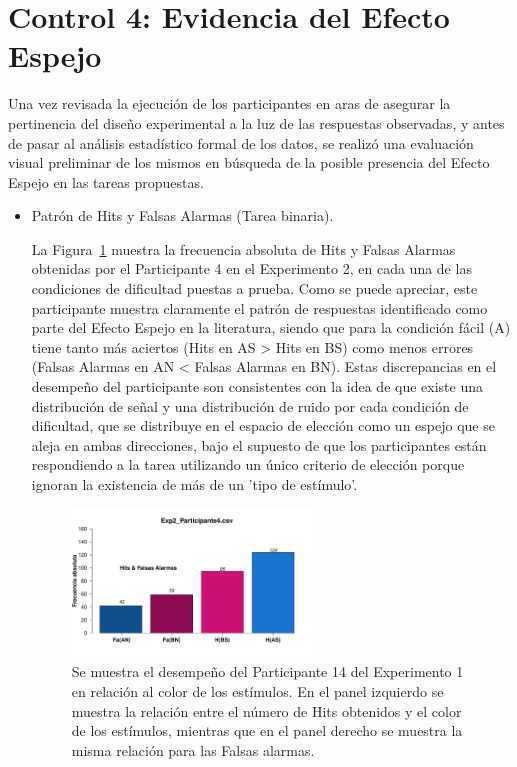 \section{Control 4: Evidencia del Efecto Espejo}

Una vez revisada la ejecución de los participantes en aras de asegurar la pertinencia del diseño experimental a la luz de las respuestas observadas, y antes de pasar al análisis estadístico formal de los datos, se realizó una evaluación visual preliminar de los mismos en búsqueda de la posible presencia del Efecto Espejo en las tareas propuestas.

\begin{itemize}
\item Patrón de Hits y Falsas Alarmas (Tarea binaria).

La Figura~\ref{fig:MirrorRate_E2_P4} muestra la frecuencia absoluta de Hits y Falsas Alarmas obtenidas por el Participante 4 en el Experimento 2, en cada una de las condiciones de dificultad puestas a prueba. Como se puede apreciar, este participante muestra claramente el patrón de respuestas identificado como parte del Efecto Espejo en la literatura, siendo que para la condición fácil (A) tiene tanto más aciertos (Hits en AS > Hits en BS) como menos errores (Falsas Alarmas en AN < Falsas Alarmas en BN). Estas discrepancias en el desempeño del participante son consistentes con la idea de que existe una distribución de señal y una distribución de ruido por cada condición de dificultad, que se distribuye en el espacio de elección como un espejo que se aleja en ambas direcciones, bajo el supuesto de que los participantes están respondiendo a la tarea utilizando un único criterio de elección porque ignoran la existencia de más de un 'tipo de estímulo'.

\begin{figure}[th]
\centering
\includegraphics[width=0.60\textwidth]{Figures/MirrorRate_Exp2_P4}
\caption[Diferencias entre Hits y Falsas Alarmas por Condición; Ejemplo]{Se muestra el desempeño del Participante 14 del Experimento 1 en relación al color de los estímulos. En el panel izquierdo se muestra la relación entre el número de Hits obtenidos y el color de los estímulos, mientras que en el panel derecho se muestra la misma relación para las Falsas alarmas.}
\label{fig:MirrorRate_E2_P4}
\end{figure}


\end{itemize}
